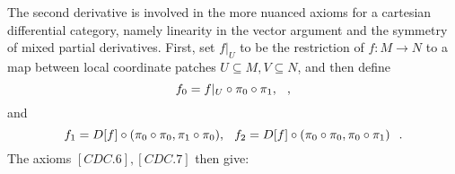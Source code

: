 The second derivative is involved in the more nuanced axioms for a cartesian differential category, namely linearity in the vector argument and the symmetry of mixed partial derivatives.  First, set $f|_U$ to be the restriction of $f:M \to N$ to a map between local coordinate patches $U \subseteq M, V \subseteq N$, and then define
\[
  f_0 = f|_U \circ \pi_0 \circ \pi_1, \hspace{0.25cm},
\]
and
\[
   f_1 = D[f] \circ (\pi_0 \circ \pi_0, \pi_1 \circ \pi_0), \hspace{0.25cm}
   f_2 = D[f] \circ (\pi_0 \circ \pi_0, \pi_0 \circ \pi_1) \hspace{0.25cm}.
\]
The axioms $[CDC.6],[CDC.7]$ then give:
\begin{center}
    
    
\end{center}

